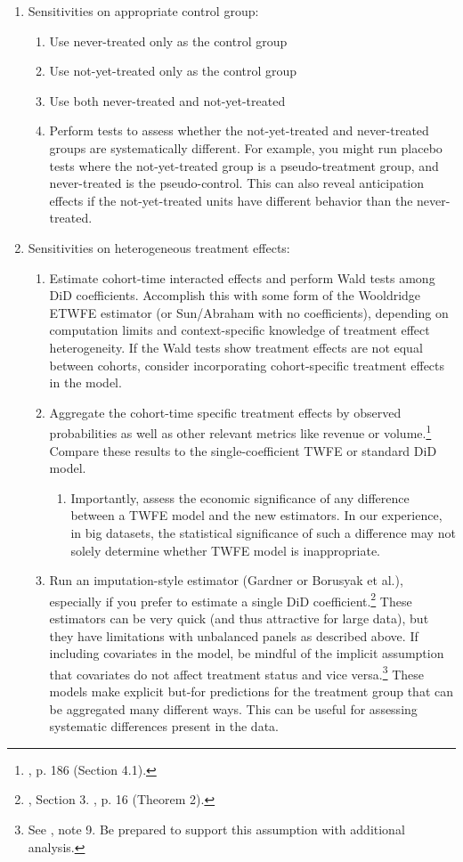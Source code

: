 \documentclass[12pt]{article}
\begin{document}
\begin{enumerate}
    \item Sensitivities on appropriate control group:
    \begin{enumerate}
        \item Use never-treated only as the control group
        \item Use not-yet-treated only as the control group
        \item Use both never-treated and not-yet-treated
        \item Perform tests to assess whether the not-yet-treated and never-treated groups are systematically different. For example, you might run placebo tests where the not-yet-treated group is a pseudo-treatment group, and never-treated is the pseudo-control. This can also reveal anticipation effects if the not-yet-treated units have different behavior than the never-treated.
    \end{enumerate}
    \item Sensitivities on heterogeneous treatment effects:
    \begin{enumerate}
        \item Estimate cohort-time interacted effects and perform Wald tests among DiD coefficients. Accomplish this with some form of the Wooldridge ETWFE estimator (or Sun/Abraham with no coefficients), depending on computation limits and context-specific knowledge of treatment effect heterogeneity. If the Wald tests show treatment effects are not equal between cohorts, consider incorporating cohort-specific treatment effects in the model.
        \item Aggregate the cohort-time specific treatment effects by observed probabilities  as well as other relevant metrics like revenue or volume.\footnote{\citet{sunabr2021a}, p. 186 (Section 4.1).}  Compare these results to the single-coefficient TWFE or standard DiD model.
        \begin{enumerate}
            \item Importantly, assess the economic significance of any difference between a TWFE model and the new estimators. In our experience, in big datasets, the statistical significance of such a difference may not solely determine whether TWFE model is inappropriate.
        \end{enumerate}
        \item Run an imputation-style estimator (Gardner or Borusyak et al.), especially if you prefer to estimate a single DiD coefficient.\footnote{\citet{gardner2022a}, Section 3. \citet{borusyak2024revisiting}, p. 16 (Theorem 2).}  These estimators can be very quick (and thus attractive for large data), but they have limitations with unbalanced panels as described above. If including covariates in the model, be mindful of the implicit assumption that covariates do not affect treatment status and vice versa.\footnote{See \citet{gardner2022a}, note 9. Be prepared to support this assumption with additional analysis.}  These models make explicit but-for predictions for the treatment group that can be aggregated many different ways. This can be useful for assessing systematic differences present in the data.

\end{enumerate}
\end{enumerate}
\end{document}
